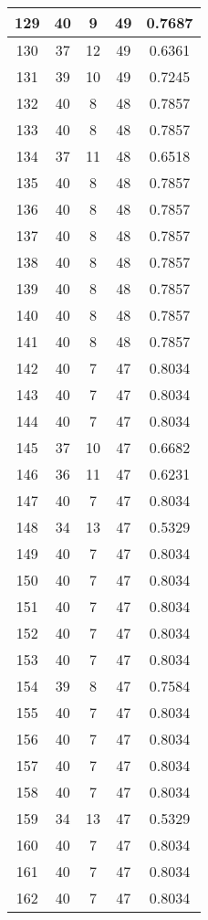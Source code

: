 \documentclass[letterpaper, 12pt]{article}
\begin{document}
\begin{longtable}{|c|c|c|c|c|}
\hline
129 & 40 & 9 & 49 & 0.7687 \\
\hline
130 & 37 & 12 & 49 & 0.6361 \\
\hline
131 & 39 & 10 & 49 & 0.7245 \\
\hline
132 & 40 & 8 & 48 & 0.7857 \\
\hline
133 & 40 & 8 & 48 & 0.7857 \\
\hline
134 & 37 & 11 & 48 & 0.6518 \\
\hline
135 & 40 & 8 & 48 & 0.7857 \\
\hline
136 & 40 & 8 & 48 & 0.7857 \\
\hline
137 & 40 & 8 & 48 & 0.7857 \\
\hline
138 & 40 & 8 & 48 & 0.7857 \\
\hline
139 & 40 & 8 & 48 & 0.7857 \\
\hline
140 & 40 & 8 & 48 & 0.7857 \\
\hline
141 & 40 & 8 & 48 & 0.7857 \\
\hline
142 & 40 & 7 & 47 & 0.8034 \\
\hline
143 & 40 & 7 & 47 & 0.8034 \\
\hline
144 & 40 & 7 & 47 & 0.8034 \\
\hline
145 & 37 & 10 & 47 & 0.6682 \\
\hline
146 & 36 & 11 & 47 & 0.6231 \\
\hline
147 & 40 & 7 & 47 & 0.8034 \\
\hline
148 & 34 & 13 & 47 & 0.5329 \\
\hline
149 & 40 & 7 & 47 & 0.8034 \\
\hline
150 & 40 & 7 & 47 & 0.8034 \\
\hline
151 & 40 & 7 & 47 & 0.8034 \\
\hline
152 & 40 & 7 & 47 & 0.8034 \\
\hline
153 & 40 & 7 & 47 & 0.8034 \\
\hline
154 & 39 & 8 & 47 & 0.7584 \\
\hline
155 & 40 & 7 & 47 & 0.8034 \\
\hline
156 & 40 & 7 & 47 & 0.8034 \\
\hline
157 & 40 & 7 & 47 & 0.8034 \\
\hline
158 & 40 & 7 & 47 & 0.8034 \\
\hline
159 & 34 & 13 & 47 & 0.5329 \\
\hline
160 & 40 & 7 & 47 & 0.8034 \\
\hline
161 & 40 & 7 & 47 & 0.8034 \\
\hline
162 & 40 & 7 & 47 & 0.8034 \\

\end{longtable}
\end{document}
